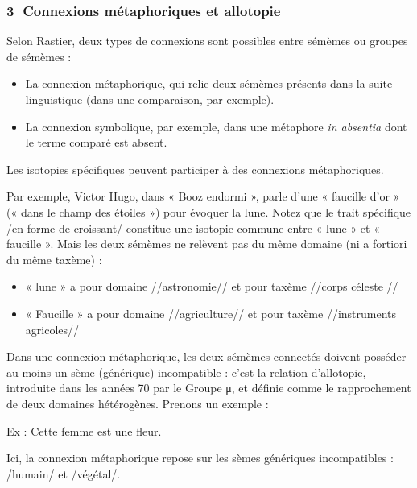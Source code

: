 \subsubsection*{\textcircled{\scriptsize 3} Connexions métaphoriques et allotopie}
Selon Rastier, deux types de connexions sont possibles entre sémèmes ou groupes de sémèmes :
\begin{itemize}
\item La connexion métaphorique, qui relie deux sémèmes présents dans la suite linguistique (dans une comparaison, par exemple).
\item La connexion symbolique, par exemple, dans une métaphore \textit{in absentia} dont le terme comparé est absent.
\end{itemize}
Les isotopies spécifiques peuvent participer à des connexions métaphoriques.

Par exemple, Victor Hugo, dans « Booz endormi », parle d’une « faucille d’or » (« dans le champ des étoiles ») pour évoquer la lune. Notez que le trait spécifique /en forme de croissant/ constitue une isotopie commune entre « lune » et « faucille ». Mais les deux sémèmes ne relèvent pas du même domaine (ni a fortiori du même taxème) :
\begin{itemize}
\item « lune » a pour domaine //astronomie// et pour taxème //corps céleste //
\item « Faucille » a pour domaine //agriculture// et pour taxème //instruments agricoles//
\end{itemize}
Dans une connexion métaphorique, les deux sémèmes connectés doivent posséder au moins un sème (générique) incompatible : c’est la relation d’allotopie, introduite dans les années 70 par le Groupe {\BBSixGreek μ}, et définie comme le rapprochement de deux domaines hétérogènes. Prenons un exemple :

Ex : Cette femme est une fleur.

Ici, la connexion métaphorique repose sur les sèmes génériques incompatibles : /humain/ et /végétal/.


